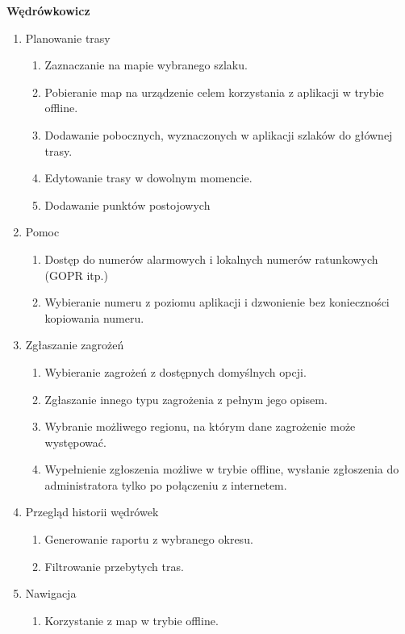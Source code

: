     \textbf{Wędrówkowicz}
    \begin{enumerate}
        \item Planowanie trasy
        \begin{enumerate}
            \item Zaznaczanie na mapie wybranego szlaku.
            \item Pobieranie map na urządzenie celem korzystania z aplikacji w trybie offline.
            \item Dodawanie pobocznych, wyznaczonych w aplikacji szlaków do głównej trasy.
            \item Edytowanie trasy w dowolnym momencie.
            \item Dodawanie punktów postojowych
        \end{enumerate}
        \item Pomoc
        \begin{enumerate}
            \item Dostęp do numerów alarmowych i lokalnych numerów ratunkowych (GOPR itp.)
            \item Wybieranie numeru z poziomu aplikacji i dzwonienie bez konieczności kopiowania numeru.
        \end{enumerate}
        \item Zgłaszanie zagrożeń
        \begin{enumerate}
            \item Wybieranie zagrożeń z dostępnych domyślnych opcji.
            \item Zgłaszanie innego typu zagrożenia z pełnym jego opisem.
            \item Wybranie możliwego regionu, na którym dane zagrożenie może występować.
            \item Wypełnienie zgłoszenia możliwe w trybie offline, wysłanie zgłoszenia do administratora tylko po połączeniu z internetem.
        \end{enumerate}
        \item Przegląd historii wędrówek
        \begin{enumerate}
            \item Generowanie raportu z wybranego okresu.
            \item Filtrowanie przebytych tras.
        \end{enumerate}
        \item Nawigacja
        \begin{enumerate}
            \item Korzystanie z map w trybie offline.

\end{enumerate}
\end{enumerate}
